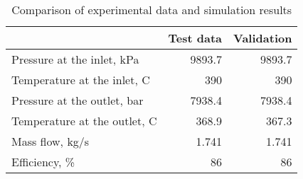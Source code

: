 \begin{table}
\label{tab:Comparison}
\caption{Comparison of experimental data and simulation results}
\begin{center}
\begin{tabulary}{0.9\linewidth}{LRR}
\toprule
& Test data \cite{Iverson_2013}  & Validation \\
\midrule
Pressure at the inlet, kPa & 9893.7 & 9893.7 \\
Temperature at the inlet, C & 390 & 390 \\
Pressure at the outlet, bar & 7938.4 & 7938.4 \\
Temperature at the outlet, C & 368.9 & 367.3 \\
Mass flow, kg/s & 1.741 & 1.741 \\
Efficiency, \% & 86 & 86 \\
\bottomrule
\end{tabulary}
\end{center}
\end{table}